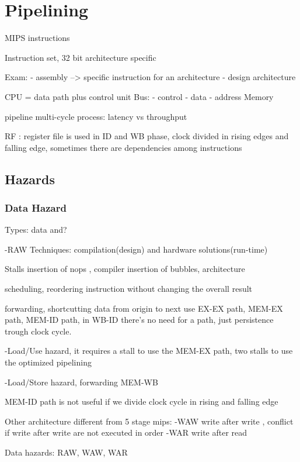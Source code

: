 
\section{Pipelining}\label{sec:pipeline}

MIPS instructions

Instruction set, 32 bit
architecture specific

Exam:
- assembly --> specific instruction for an architecture
- design architecture

CPU = data path plus  control unit
Bus:
- control
- data
- address
Memory

pipeline multi-cycle process: latency vs throughput

RF : register file is used in ID and WB phase, clock divided in rising edges and falling edge, sometimes there
are dependencies among instructions

\subsection{Hazards}\label{subsec:hazards}

\subsubsection{Data Hazard}
Types:
data
and?

-RAW
Techniques: compilation(design) and hardware solutions(run-time)

Stalls
insertion of nops , compiler
insertion of bubbles, architecture

scheduling, reordering instruction without changing the overall result

forwarding, shortcutting data from origin to next use EX-EX path, MEM-EX path, MEM-ID path, in WB-ID there's no
need for a path, just persistence trough clock cycle.

-Load/Use hazard, it requires a stall to use the MEM-EX path, two stalls to use the optimized pipelining

-Load/Store hazard, forwarding MEM-WB

MEM-ID path is not useful if we divide clock cycle in rising and falling edge

Other architecture different from 5 stage mips:
-WAW write after write , conflict if write after write are not executed in order
-WAR write after read

Data hazards: RAW, WAW, WAR

